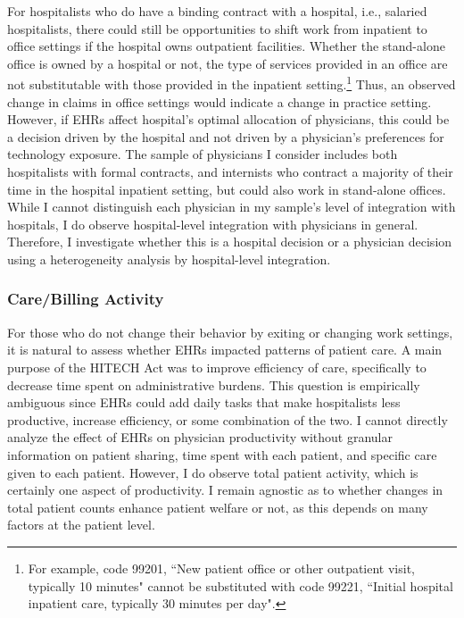 \documentclass[12pt]{article}
\begin{document}
For hospitalists who do have a binding contract with a hospital, i.e., salaried hospitalists, there could still be opportunities to shift work from inpatient to office settings if the hospital owns outpatient facilities. Whether the stand-alone office is owned by a hospital or not, the type of services provided in an office are not substitutable with those provided in the inpatient setting.\footnote{For example, code 99201, ``New patient office or other outpatient visit, typically 10 minutes" cannot be substituted with code 99221, ``Initial hospital inpatient care, typically 30 minutes per day".} Thus, an observed change in claims in office settings would indicate a change in practice setting. However, if EHRs affect hospital's optimal allocation of physicians, this could be a decision driven by the hospital and not driven by a physician's preferences for technology exposure. The sample of physicians I consider includes both hospitalists with formal contracts, and internists who contract a majority of their time in the hospital inpatient setting, but could also work in stand-alone offices. While I cannot distinguish each physician in my sample's level of integration with hospitals, I do observe hospital-level integration with physicians in general. Therefore, I investigate whether this is a hospital decision or a physician decision using a heterogeneity analysis by hospital-level integration. 



\subsubsection{Care/Billing Activity}

For those who do not change their behavior by exiting or changing work settings, it is natural to assess whether EHRs impacted patterns of patient care. A main purpose of the HITECH Act was to improve efficiency of care, specifically to decrease time spent on administrative burdens. This question is empirically ambiguous since EHRs could add daily tasks that make hospitalists less productive, increase efficiency, or some combination of the two. I cannot directly analyze the effect of EHRs on physician productivity without granular information on patient sharing, time spent with each patient, and specific care given to each patient. However, I do observe total patient activity, which is certainly one aspect of productivity. I remain agnostic as to whether changes in total patient counts enhance patient welfare or not, as this depends on many factors at the patient level. 
\end{document}
